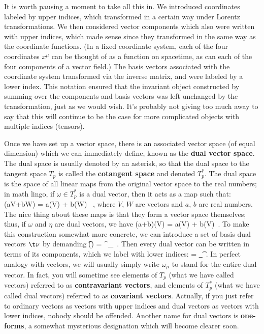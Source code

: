 \documentclass[12pt]{article}
\begin{document}
It is worth pausing a moment to take all this in.  We introduced
coordinates labeled by upper indices, which transformed in a certain
way under Lorentz transformations.  We then considered vector components
which also were written with upper indices, which made sense since they
transformed in the same way as the coordinate functions.  (In a fixed
coordinate system, each of the four coordinates $x^\mu$ can be thought
of as a function on spacetime, as can each of the four components of
a vector field.)  The basis vectors associated with the coordinate
system transformed via the inverse matrix, and were labeled by a 
lower index.  This notation ensured that the invariant object constructed
by summing over the components and basis vectors was left unchanged by
the transformation, just as we would wish.  It's probably not giving too
much away to say that this will continue to be the case for more
complicated objects with multiple indices (tensors). 

Once we have set up a vector space, there is an associated vector space
(of equal dimension) which
we can immediately define, known as the {\bf dual vector space}.
The dual space is usually denoted by an asterisk, so that the dual 
space to the tangent space $T_p$ is called the {\bf cotangent space}
and denoted $T^*_p$.  The dual space is
the space of all linear maps from the original vector space to the real
numbers; in math lingo, if $\omega\in T_p^*$ is a dual vector, then it acts
as a map such that:
\be
  \omega(aV+bW) = a\omega(V) + b\omega(W) \ ,\label{1.31}
\ee
where $V$, $W$ are vectors and $a$, $b$ are real numbers.  The nice 
thing about these maps is that they form a vector space themselves; thus,
if $\omega$ and $\eta$ are dual vectors, we have
\be
  (a\omega+b\eta)(V) = a\omega(V) + b\eta(V)\ .\label{1.32}
\ee
To make this construction somewhat more concrete, we can introduce a
set of basis dual vectors $\t\nu$ by demanding
\be
  \t\nu(\e\mu) = \delta^\nu_\mu\ .\label{1.33}
\ee
Then every dual vector can be written in terms of its components, which
we label with lower indices:
\be
  \omega = \omega_\mu\t\mu\ .\label{1.34}
\ee
In perfect analogy with vectors, we will usually simply write
$\omega_\mu$ to stand for the entire dual vector.  In fact, you will
sometime see elements of $T_p$ (what we have called vectors) referred
to as {\bf contravariant vectors}, and elements of $T_p^*$ (what we
have called dual vectors) referred to as {\bf covariant vectors}.  Actually,
if you just refer to ordinary vectors as vectors with upper indices
and dual vectors as vectors with lower indices, nobody should be 
offended.  Another name for dual vectors is {\bf one-forms}, a somewhat
mysterious designation which will become clearer soon.
\end{document}
